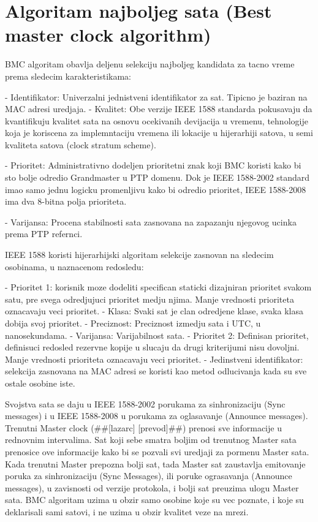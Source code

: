 \documentclass[a4paper,12pt, master]{etf}
\begin{document}
	\section{Algoritam najboljeg sata (Best master clock algorithm)}
	BMC algoritam obavlja deljenu selekciju najboljeg kandidata za tacno vreme prema sledecim
	karakteristikama:

	- Identifikator: Univerzalni jednistveni identifikator za sat. Tipicno je baziran na MAC adresi
	uredjaja.
	- Kvalitet: Obe verzije IEEE 1588 standarda pokusavaju da kvantifikuju kvalitet sata na osnovu
	ocekivanih devijacija u vremenu, tehnologije koja je koriscena za implemntaciju vremena ili
	lokacije u hijerarhiji satova, u semi kvaliteta satova (clock stratum scheme).

	- Prioritet: Administrativno dodeljen prioritetni znak koji BMC koristi kako bi sto bolje
	odredio Grandmaster u PTP domenu. Dok je IEEE 1588-2002 standard imao samo jednu logicku
	promenljivu kako bi odredio prioritet, IEEE 1588-2008 ima dva 8-bitna polja prioriteta.

	- Varijansa: Procena stabilnosti sata zasnovana na zapazanju njegovog ucinka prema PTP refernci.

	IEEE 1588 koristi hijerarhijski algoritam selekcije zasnovan na sledecim osobinama, u
	naznacenom redosledu:

	- Prioritet 1: korisnik moze dodeliti specifican staticki dizajniran prioritet svakom satu, pre
	svega odredjujuci prioritet medju njima. Manje vrednosti prioriteta oznacavaju veci prioritet.
	- Klasa: Svaki sat je clan odredjene klase, svaka klasa dobija svoj prioritet.
	- Preciznost: Preciznost izmedju sata i UTC, u nanosekundama.
	- Varijansa: Varijabilnost sata.
	- Prioritet 2: Definisan prioritet, definisuci redosled rezervne kopije u slucaju da drugi
	kriterijumi nisu dovoljni. Manje vrednosti prioriteta oznacavaju veci prioritet.
	- Jedinstveni identifikator: selekcija zasnovana na MAC adresi se koristi kao metod odlucivanja
	kada su sve ostale osobine iste.

	Svojstva sata se daju u IEEE 1588-2002 porukama za sinhronizaciju (Sync messages) i u IEEE
	1588-2008 u porukama za oglasavanje (Announce messages). Trenutni Master clock (\#\#[lazarc]
	[prevod]\#\#) prenosi sve informacije u rednovnim intervalima. Sat koji sebe smatra boljim od
	trenutnog Master sata prenosice ove informacije kako bi se pozvali svi uredjaji za pormenu
	Master sata. Kada trenutni Master prepozna bolji sat, tada Master sat zaustavlja emitovanje
	poruka za sinhronizaciju (Sync Messages), ili poruke ograsavanja (Announce messages), u
	zavisnosti od verzije protokola, i bolji sat preuzima ulogu Master sata. BMC algoritam uzima u
	obzir samo osobine koje su vec poznate, i koje su deklarisali sami satovi, i ne uzima u obzir
	kvalitet veze na mrezi.
\end{document}
